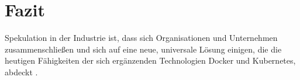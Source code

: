 \documentclass[../main.tex]{subfiles}
\begin{document}
\chapter{Fazit}
\label{result}

  Spekulation in der Industrie ist, dass sich Organisationen und Unternehmen zusammenschließen und sich auf eine neue, universale Lösung einigen, die die heutigen Fähigkeiten der sich ergänzenden Technologien Docker und Kubernetes, abdeckt \cite[S.4]{dockerLXCKub}.
\end{document}
